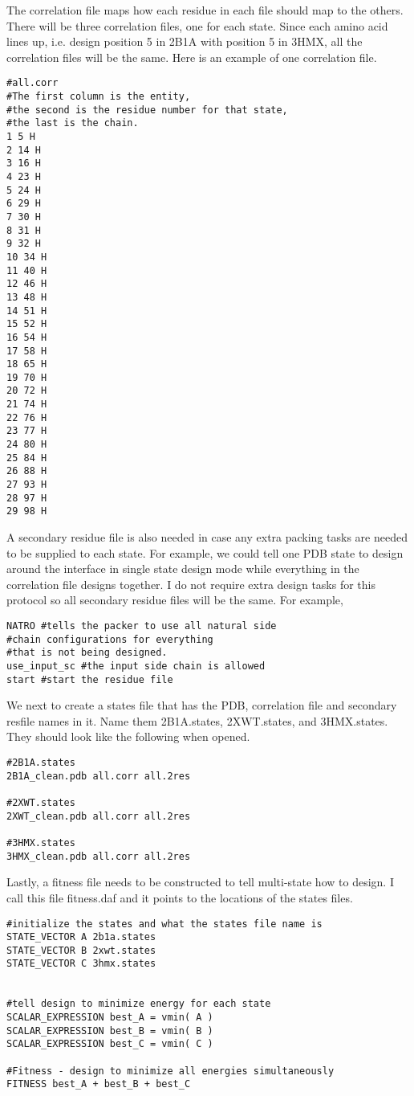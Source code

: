 The correlation file maps how each residue in each file should map to the others. There will be three correlation files, one for each state. Since each amino acid lines up, i.e. design position 5 in 2B1A with position 5 in 3HMX, all the correlation files will be the same. Here is an example of one correlation file.

\begin{lstlisting}
#all.corr
#The first column is the entity,
#the second is the residue number for that state,
#the last is the chain.
1 5 H
2 14 H
3 16 H
4 23 H
5 24 H
6 29 H
7 30 H
8 31 H
9 32 H
10 34 H
11 40 H
12 46 H
13 48 H
14 51 H
15 52 H
16 54 H
17 58 H
18 65 H
19 70 H
20 72 H
21 74 H
22 76 H
23 77 H
24 80 H
25 84 H
26 88 H
27 93 H
28 97 H
29 98 H
\end{lstlisting}
A secondary residue file is also needed in case any extra packing tasks are needed to be supplied to each state. For example, we could tell one PDB state to design around the interface in single state design mode while everything in the correlation file designs together. I do not require extra design tasks for this protocol so all secondary residue files will be the same. For example,

\begin{lstlisting}
NATRO #tells the packer to use all natural side
#chain configurations for everything
#that is not being designed.
use_input_sc #the input side chain is allowed
start #start the residue file
\end{lstlisting}

We next to create a states file that has the PDB, correlation file and secondary resfile names in it. Name them 2B1A.states, 2XWT.states, and 3HMX.states. They should look like the following when opened.

\begin{lstlisting}
#2B1A.states
2B1A_clean.pdb all.corr all.2res

#2XWT.states
2XWT_clean.pdb all.corr all.2res

#3HMX.states
3HMX_clean.pdb all.corr all.2res
\end{lstlisting}

Lastly, a fitness file needs to be constructed to tell multi-state how to design. I call this file fitness.daf and it points to the locations of the states files.

\begin{lstlisting}
#initialize the states and what the states file name is
STATE_VECTOR A 2b1a.states
STATE_VECTOR B 2xwt.states
STATE_VECTOR C 3hmx.states


#tell design to minimize energy for each state
SCALAR_EXPRESSION best_A = vmin( A )
SCALAR_EXPRESSION best_B = vmin( B )
SCALAR_EXPRESSION best_C = vmin( C )

#Fitness - design to minimize all energies simultaneously
FITNESS best_A + best_B + best_C
\end{lstlisting}

